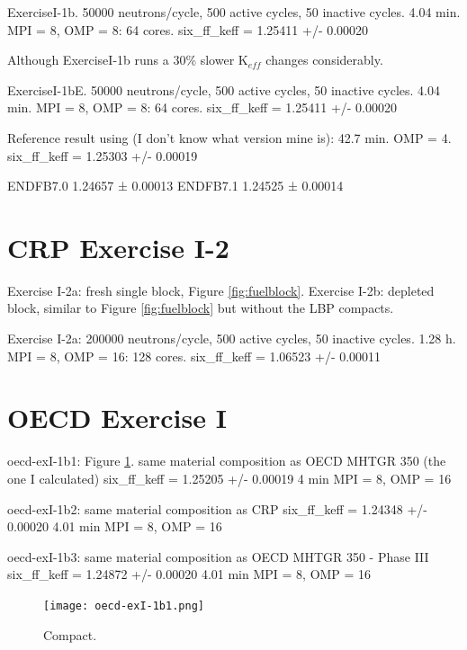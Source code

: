 \documentclass[11pt,letterpaper]{article}
\begin{document}


ExerciseI-1b. 
50000 neutrons/cycle, 500 active cycles, 50 inactive cycles.
4.04 min. MPI = 8, OMP = 8: 64 cores.
six_ff_keff = 1.25411 +/- 0.00020

Although ExerciseI-1b runs a 30\% slower K$_{eff}$ changes considerably.

ExerciseI-1bE. 
50000 neutrons/cycle, 500 active cycles, 50 inactive cycles.
4.04 min. MPI = 8, OMP = 8: 64 cores.
six_ff_keff = 1.25411 +/- 0.00020

Reference result using (I don't know what version mine is):
42.7 min. OMP = 4.
six_ff_keff = 1.25303 +/- 0.00019

ENDFB7.0 1.24657 ± 0.00013
ENDFB7.1 1.24525 ± 0.00014

\section{CRP Exercise I-2}

Exercise I-2a: fresh single block, Figure \ref{fig:fuelblock}.
Exercise I-2b: depleted block, similar to Figure \ref{fig:fuelblock} but without the LBP compacts.

Exercise I-2a:
200000 neutrons/cycle, 500 active cycles, 50 inactive cycles.
1.28 h. MPI = 8, OMP = 16: 128 cores.
six_ff_keff = 1.06523 +/- 0.00011

\section{OECD Exercise I}

oecd-exI-1b1: Figure \ref{fig:compact}.
same material composition as OECD MHTGR 350 (the one I calculated)
six_ff_keff = 1.25205 +/- 0.00019
4 min MPI = 8, OMP = 16

oecd-exI-1b2:
same material composition as CRP
six_ff_keff = 1.24348 +/- 0.00020
4.01 min MPI = 8, OMP = 16

oecd-exI-1b3:
same material composition as OECD MHTGR 350 - Phase III
six_ff_keff = 1.24872 +/- 0.00020
4.01 min MPI = 8, OMP = 16

\begin{figure}[htbp!]
	\centering
	\texttt{[image: oecd-exI-1b1.png]}
	\caption{Compact.}
	\label{fig:compact}
\end{figure}
\end{document}
